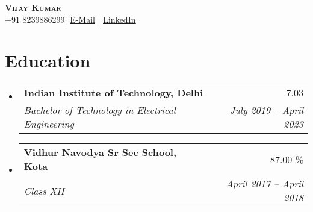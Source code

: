 \documentclass[letterpaper,11pt]{article}
\makeatletter
\newcommand{\resumeSubheading}[4]{
  \vspace{-2pt}\item
    \begin{tabular*}{0.97\textwidth}[t]{l@{\extracolsep{\fill}}r}
      \textbf{#1} & #2 \\
      \textit{\small#3} & \textit{\small #4} \\
    \end{tabular*}\vspace{-7pt}
}
\newcommand{\resumeSubHeadingListStart}{\begin{itemize}[leftmargin=0.15in, label={}]}
\newcommand{\resumeSubHeadingListEnd}{\end{itemize}}
\makeatother
\begin{document}
\begin{center}
    \textbf{\Huge \scshape Vijay Kumar } \\ \vspace{5pt}
    \small+91 8239886299$|$ \href{mailto:vijayk30606@gmail.com}{\underline{E-Mail}} $|$ 
    \href{https://www.linkedin.com/in/vijay-kumar-6a32101b1}{\underline{LinkedIn}}
\end{center}

\section{Education}
  \resumeSubHeadingListStart
    \resumeSubheading
      {Indian Institute of Technology, Delhi}{7.03}
      {Bachelor of Technology in Electrical Engineering}{July 2019 -- April 2023}
    \resumeSubheading
      {Vidhur Navodya Sr Sec School, Kota}{87.00 \%}
      {Class XII}{April 2017 -- April 2018}
  \resumeSubHeadingListEnd



\end{document}
